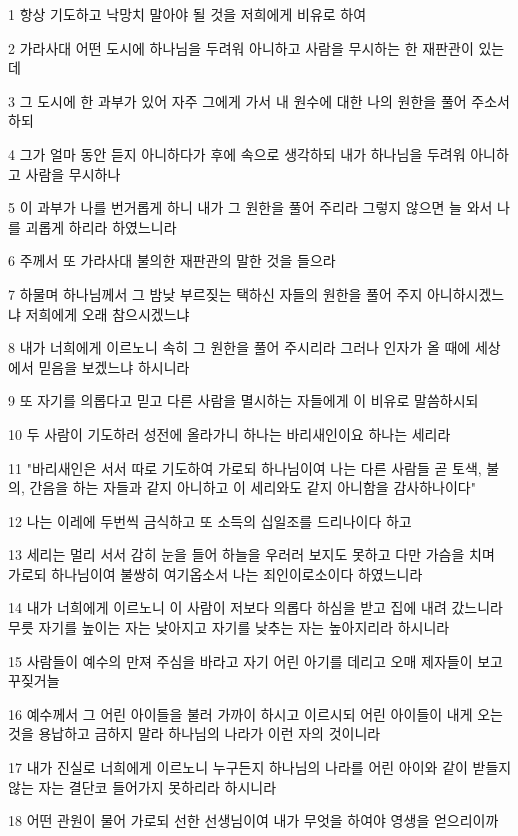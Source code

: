 \par 1 항상 기도하고 낙망치 말아야 될 것을 저희에게 비유로 하여
\par 2 가라사대 어떤 도시에 하나님을 두려워 아니하고 사람을 무시하는 한 재판관이 있는데
\par 3 그 도시에 한 과부가 있어 자주 그에게 가서 내 원수에 대한 나의 원한을 풀어 주소서 하되
\par 4 그가 얼마 동안 듣지 아니하다가 후에 속으로 생각하되 내가 하나님을 두려워 아니하고 사람을 무시하나
\par 5 이 과부가 나를 번거롭게 하니 내가 그 원한을 풀어 주리라 그렇지 않으면 늘 와서 나를 괴롭게 하리라 하였느니라
\par 6 주께서 또 가라사대 불의한 재판관의 말한 것을 들으라
\par 7 하물며 하나님께서 그 밤낮 부르짖는 택하신 자들의 원한을 풀어 주지 아니하시겠느냐 저희에게 오래 참으시겠느냐
\par 8 내가 너희에게 이르노니 속히 그 원한을 풀어 주시리라 그러나 인자가 올 때에 세상에서 믿음을 보겠느냐 하시니라
\par 9 또 자기를 의롭다고 믿고 다른 사람을 멸시하는 자들에게 이 비유로 말씀하시되
\par 10 두 사람이 기도하러 성전에 올라가니 하나는 바리새인이요 하나는 세리라
\par 11 "바리새인은 서서 따로 기도하여 가로되 하나님이여 나는 다른 사람들 곧 토색, 불의, 간음을 하는 자들과 같지 아니하고 이 세리와도 같지 아니함을 감사하나이다"
\par 12 나는 이레에 두번씩 금식하고 또 소득의 십일조를 드리나이다 하고
\par 13 세리는 멀리 서서 감히 눈을 들어 하늘을 우러러 보지도 못하고 다만 가슴을 치며 가로되 하나님이여 불쌍히 여기옵소서 나는 죄인이로소이다 하였느니라
\par 14 내가 너희에게 이르노니 이 사람이 저보다 의롭다 하심을 받고 집에 내려 갔느니라 무릇 자기를 높이는 자는 낮아지고 자기를 낮추는 자는 높아지리라 하시니라
\par 15 사람들이 예수의 만져 주심을 바라고 자기 어린 아기를 데리고 오매 제자들이 보고 꾸짖거늘
\par 16 예수께서 그 어린 아이들을 불러 가까이 하시고 이르시되 어린 아이들이 내게 오는 것을 용납하고 금하지 말라 하나님의 나라가 이런 자의 것이니라
\par 17 내가 진실로 너희에게 이르노니 누구든지 하나님의 나라를 어린 아이와 같이 받들지 않는 자는 결단코 들어가지 못하리라 하시니라
\par 18 어떤 관원이 물어 가로되 선한 선생님이여 내가 무엇을 하여야 영생을 얻으리이까
